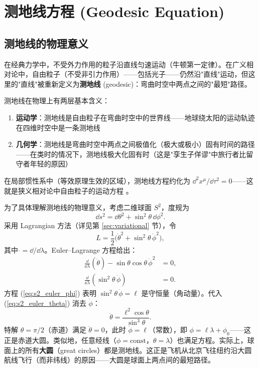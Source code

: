 \chapter{测地线方程 (Geodesic Equation)}
\label{chap:geodesic}

\section{测地线的物理意义}

\begin{note}[物理动机]
在经典力学中，不受外力作用的粒子沿直线匀速运动（牛顿第一定律）。在广义相对论中，自由粒子（不受非引力作用）——包括光子——仍然沿"直线"运动，但这里的"直线"被重新定义为\textbf{测地线} (geodesic)：弯曲时空中两点之间的"最短"路径。

测地线在物理上有两层基本含义：
\begin{enumerate}
    \item \textbf{运动学}：测地线是自由粒子在弯曲时空中的世界线——地球绕太阳的运动轨迹在四维时空中是一条测地线
    \item \textbf{几何学}：测地线是弯曲时空中两点之间极值化（极大或极小）固有时间的路径——在类时的情况下，测地线极大化固有时（这是"孪生子佯谬"中旅行者比留守者年轻的原因）
\end{enumerate}

在局部惯性系中（等效原理生效的区域），测地线方程约化为 $\dd^2 x^\mu/\dd\tau^2 = 0$——这就是狭义相对论中自由粒子的运动方程 \cite{Carroll1997}。
\end{note}

\begin{example}[S$^2$ 上的大圆是测地线]
为了具体理解测地线的物理意义，考虑二维球面 $S^2$，度规为
\begin{equation}
    \dd s^2 = \dd\theta^2 + \sin^2\theta \, \dd\phi^2.
\end{equation}
采用 Lagrangian 方法（详见第 \ref{sec:variational} 节），令
\begin{equation}
    L = \frac{1}{2}\bigl(\dot\theta^2 + \sin^2\theta \, \dot\phi^2\bigr),
\end{equation}
其中 $\dot{}=\dd/\dd\lambda$。Euler--Lagrange 方程给出：
\begin{align}
    \frac{\dd}{\dd\lambda}(\dot\theta) - \sin\theta\cos\theta \, \dot\phi^2 &= 0, \label{eq:s2_euler_theta}\\
    \frac{\dd}{\dd\lambda}(\sin^2\theta \, \dot\phi) &= 0. \label{eq:s2_euler_phi}
\end{align}
方程 (\ref{eq:s2_euler_phi}) 表明 $\sin^2\theta \, \dot\phi = \ell$ 是守恒量（角动量）。代入 (\ref{eq:s2_euler_theta}) 消去 $\dot\phi$：
\begin{equation}
    \ddot\theta = \frac{\ell^2 \cos\theta}{\sin^3\theta}.
\end{equation}
特解 $\theta = \pi/2$（赤道）满足 $\ddot\theta = 0$，此时 $\dot\phi = \ell$（常数），即 $\phi = \ell\lambda + \phi_0$——这正是赤道大圆。类似地，任意经线（$\phi = \text{const}$，$\theta = \lambda$）也满足方程。实际上，球面上的所有\textbf{大圆}（great circles）都是测地线。这正是飞机从北京飞往纽约沿大圆航线飞行（而非纬线）的原因——大圆是球面上两点间的最短路径。
\end{example}

